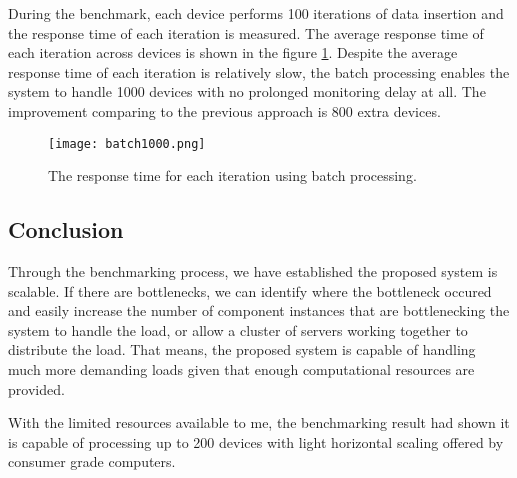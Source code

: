 \documentclass[../thesis.tex]{subfiles}
\begin{document}
During the benchmark, each device performs 100 iterations of data insertion and the response time of each iteration is measured. The average response time of each iteration across devices is shown in the figure \ref{fig:batch}. Despite the average response time of each iteration is relatively slow, the batch processing enables the system to handle 1000 devices with no prolonged monitoring delay at all. The improvement comparing to the previous approach is 800 extra devices. 

\begin{figure}[!ht]
	\centering
	\texttt{[image: batch1000.png]}
	\caption{The response time for each iteration using batch processing.}
	\label{fig:batch}
\end{figure}



\subsection{Conclusion}

Through the benchmarking process, we have established the proposed system is scalable. If there are bottlenecks, we can identify where the bottleneck occured and easily increase the number of component instances that are bottlenecking the system to handle the load, or allow a cluster of servers working together to distribute the load. That means, the proposed system is capable of handling much more demanding loads given that enough computational resources are provided. 

With the limited resources available to me, the benchmarking result had shown it is capable of processing up to 200 devices with light horizontal scaling offered by consumer grade computers. 
\end{document}
